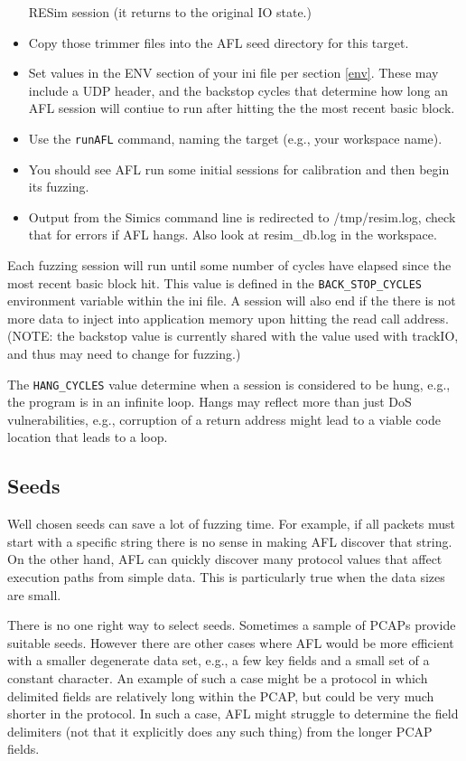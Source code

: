 \documentclass[titlepage]{article}
\begin{document}
\begin{itemize}
RESim session (it returns to the original IO state.) 
\item Copy those trimmer files into the AFL seed directory for this target.
\item Set values in the ENV section of your ini file per section \ref{env}.  These may include a UDP header, and the 
backstop cycles that determine how long an AFL session will contiue to run after hitting the the most recent basic block. 
\item Use the {\tt runAFL} command, naming the target (e.g., your workspace name).
\item You should see AFL run some initial sessions for calibration and then begin its fuzzing.
\item Output from the Simics command line is redirected to /tmp/resim.log, check that for errors if AFL hangs.  Also look at resim\_db.log
in the workspace.
\end{itemize}

Each fuzzing session will run until some number of cycles have elapsed since the most recent basic block hit.  This
value is defined in the {\tt BACK\_STOP\_CYCLES} environment variable within the ini file.  A session will also end
if the there is not more data to inject into application memory upon hitting the read call address.
(NOTE: the backstop value is currently shared with the value used with trackIO, and thus may need to change for fuzzing.)

The {\tt HANG\_CYCLES} value determine when a session is considered to be hung, e.g., the program is in an infinite loop.
Hangs may reflect more than just DoS vulnerabilities, e.g., corruption of a return address might lead to a viable code location
that leads to a loop.

\subsection{Seeds}
Well chosen seeds can save a lot of fuzzing time.  For example, if all packets must start with a specific string there is no sense in
making AFL discover that string.  On the other hand, AFL can quickly discover many protocol values that affect execution paths from simple
data.  This is particularly true when the data sizes are small.  

There is no one right way to select seeds.  Sometimes a sample of PCAPs provide suitable seeds.  However there are other cases where AFL would
be more efficient with a smaller degenerate data set, e.g., a few key fields and a small set of a constant character.  An example of such a case
might be a protocol in which delimited fields are relatively long within the PCAP, but could be very much shorter in the protocol.  In such a case,
AFL might struggle to determine the field delimiters (not that it explicitly does any such thing) from the longer PCAP fields.
\end{document}
